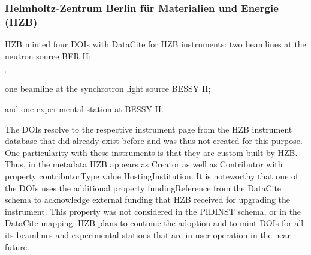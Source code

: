 \documentclass[a4paper,10pt,english]{sphinxmanual}
\begin{document}
\subsubsection{Helmholtz-Zentrum Berlin für Materialien und Energie (HZB)}
\label{\detokenize{white-paper/adoption:helmholtz-zentrum-berlin-fur-materialien-und-energie-hzb}}
HZB minted four DOIs with DataCite for HZB instruments: two beamlines
at the neutron source BER II;%
\begin{footnote}[1]\sphinxAtStartFootnote
{}
%
\end{footnote}$^{\text{,}}$%
\begin{footnote}[2]\sphinxAtStartFootnote
{}
%
\end{footnote} one
beamline at the synchrotron light source BESSY II;%
\begin{footnote}[3]\sphinxAtStartFootnote
{}
%
\end{footnote} and
one experimental station at BESSY II.%
\begin{footnote}[4]\sphinxAtStartFootnote
{}
%
\end{footnote} The DOIs resolve
to the respective instrument page from the HZB instrument database
that did already exist before and was thus not created for this
purpose.  One particularity with these instruments is that they are
custom built by HZB.  Thus, in the metadata HZB appears as Creator as
well as Contributor with property contributorType value
HostingInstitution.  It is noteworthy that one of the DOIs uses the
additional property fundingReference from the DataCite schema to
acknowledge external funding that HZB received for upgrading the
instrument.  This property was not considered in the PIDINST schema,
or in the DataCite mapping.  HZB plans to continue the adoption and to
mint DOIs for all its beamlines and experimental stations that are in
user operation in the near future.
\end{document}
